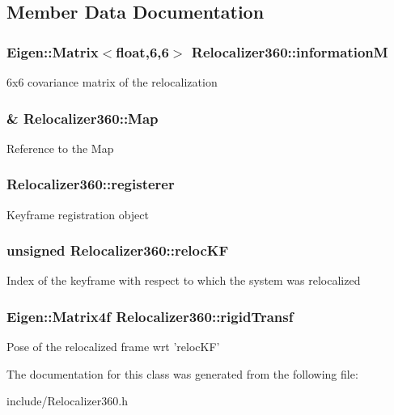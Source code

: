 \subsection{Member Data Documentation}
\hypertarget{classRelocalizer360_ae403c7df20c063687f14726ea1fa9e22}{
\subsubsection[{information\-M}]{\setlength{\rightskip}{0pt plus 5cm}Eigen\-::\-Matrix$<$float,6,6$>$ Relocalizer360\-::information\-M}}\label{classRelocalizer360_ae403c7df20c063687f14726ea1fa9e22}
6x6 covariance matrix of the relocalization \hypertarget{classRelocalizer360_a537a5a4228c0e1f03185f58caf7e4123}{
\subsubsection[{Map}]{\& Relocalizer360\-::\-Map\hspace{0.3cm}{\ttfamily [private]}}}\label{classRelocalizer360_a537a5a4228c0e1f03185f58caf7e4123}
Reference to the Map \hypertarget{classRelocalizer360_ae782e8bb7b638e264247afdc754c1891}{
\subsubsection[{registerer}]{ Relocalizer360\-::registerer}}\label{classRelocalizer360_ae782e8bb7b638e264247afdc754c1891}
Keyframe registration object \hypertarget{classRelocalizer360_a7391b203d219d35f74f5566cd5b3a154}{
\subsubsection[{reloc\-K\-F}]{\setlength{\rightskip}{0pt plus 5cm}unsigned Relocalizer360\-::reloc\-K\-F}}\label{classRelocalizer360_a7391b203d219d35f74f5566cd5b3a154}
Index of the keyframe with respect to which the system was relocalized \hypertarget{classRelocalizer360_a4c7afb62e3812f6aecdf64f8f3790084}{
\subsubsection[{rigid\-Transf}]{\setlength{\rightskip}{0pt plus 5cm}Eigen\-::\-Matrix4f Relocalizer360\-::rigid\-Transf}}\label{classRelocalizer360_a4c7afb62e3812f6aecdf64f8f3790084}
Pose of the relocalized frame wrt 'reloc\-K\-F' 

The documentation for this class was generated from the following file\-:\begin{DoxyCompactItemize}
\item 
include/Relocalizer360.\-h\end{DoxyCompactItemize}
